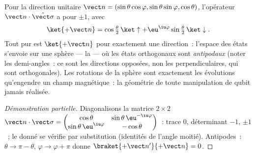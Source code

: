 \begin{proposition}\label{prop:b3:spin-two-level:bloch}
Pour la direction unitaire $\vect n = (\sin\theta\cos\varphi,
\sin\theta\sin\varphi, \cos\theta)$, l'opérateur $\vect
n\cdot\hat{\vect\sigma}$ a pour  $\pm1$, avec
\[
\ket{+\vect n} = \cos\tfrac\theta2\,\ket\uparrow +
\eu^{\iu\varphi}\sin\tfrac\theta2\,\ket\downarrow .
\]
Tout  pur est $\ket{+\vect n}$ pour exactement une direction~:
l'espace des états s'envoie sur une sphère --- la \emph{} --- où les états orthogonaux sont \emph{antipodaux} (noter les
demi-angles~: ce sont les directions opposées, non les
perpendiculaires, qui sont orthogonales). Les rotations de la sphère
sont exactement les évolutions qu'engendre un champ magnétique~: la
géométrie de toute manipulation de qubit jamais réalisée.
\end{proposition}

\begin{proof}[Démonstration partielle]
Diagonalisons la matrice $2\times2$ $\vect n\cdot\vect\sigma =
\begin{pmatrix}\cos\theta & \sin\theta\,\eu^{-\iu\varphi}\\
\sin\theta\,\eu^{\iu\varphi} & -\cos\theta\end{pmatrix}$~: trace $0$,
déterminant $-1$,  $\pm1$~; le  donné se
vérifie par substitution (identités de l'angle moitié). Antipodes~: $\theta \to \pi -
\theta$, $\varphi \to \varphi + \pi$ donne $\braket{+\vect
n'}{+\vect n} = 0$.
\end{proof}

